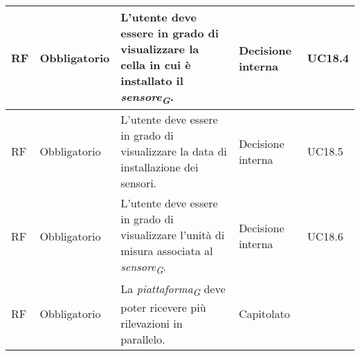 \begin{longtable}{|C{1.5cm}|C{2cm}|L{5cm}|C{2cm}|C{1.5cm}|}
    \hline
     RF & Obbligatorio & L'utente deve essere in grado di visualizzare la cella in cui è installato il \textit{sensore}\textsubscript{\textit{G}}.& Decisione interna & UC18.4 \\

    \hline
     RF & Obbligatorio & L'utente deve essere in grado di visualizzare la data di installazione dei sensori.& Decisione interna & UC18.5 \\

    \hline
     RF & Obbligatorio & L'utente deve essere in grado di visualizzare l'unità di misura associata al \textit{sensore}\textsubscript{\textit{G}}.& Decisione interna & UC18.6 \\
    
    \hline
     RF & Obbligatorio & La \textit{piattaforma}\textsubscript{\textit{G}} deve poter ricevere più rilevazioni in parallelo. & Capitolato &  \\

    \hline
    
\end{longtable}


